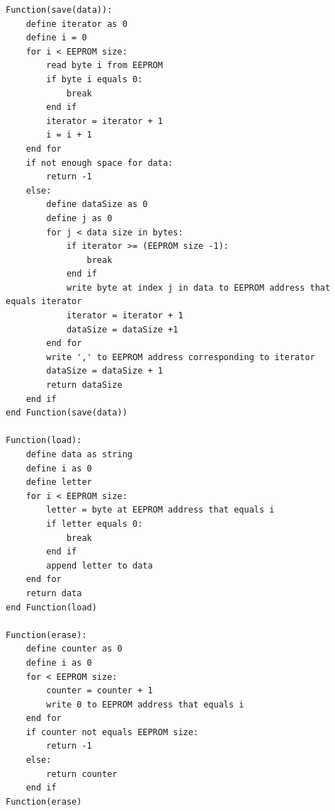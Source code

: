 \begin{lstlisting}[frame=single, label=pseodoLocalStorageService, caption={Pseudocode of LocalStorageService save(), load() and erase() functions}]
Function(save(data)):
    define iterator as 0
    define i = 0
    for i < EEPROM size:
        read byte i from EEPROM
        if byte i equals 0:
            break
        end if
        iterator = iterator + 1
        i = i + 1
    end for
    if not enough space for data:
        return -1
    else:
        define dataSize as 0
        define j as 0
        for j < data size in bytes:
            if iterator >= (EEPROM size -1):
                break
            end if
            write byte at index j in data to EEPROM address that equals iterator
            iterator = iterator + 1
            dataSize = dataSize +1
        end for
        write ',' to EEPROM address corresponding to iterator
        dataSize = dataSize + 1
        return dataSize
    end if
end Function(save(data))

Function(load):
    define data as string
    define i as 0
    define letter
    for i < EEPROM size:
        letter = byte at EEPROM address that equals i
        if letter equals 0:
            break
        end if
        append letter to data
    end for
    return data
end Function(load)

Function(erase):
    define counter as 0
    define i as 0
    for < EEPROM size:
        counter = counter + 1
        write 0 to EEPROM address that equals i
    end for
    if counter not equals EEPROM size:
        return -1
    else:
        return counter
    end if
Function(erase)
\end{lstlisting}

